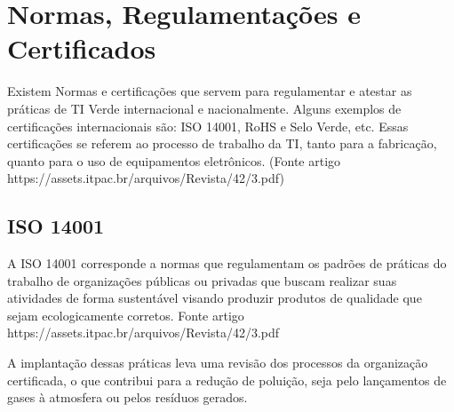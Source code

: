 \section{Normas, Regulamentações e Certificados}
Existem Normas e certificações que servem para regulamentar e atestar as práticas de TI Verde internacional e nacionalmente. Alguns exemplos de certificações internacionais são: ISO 14001, RoHS e Selo Verde, etc. Essas certificações se referem ao processo de trabalho da TI, tanto para a fabricação, quanto para o uso de equipamentos eletrônicos. (Fonte artigo https://assets.itpac.br/arquivos/Revista/42/3.pdf)

\subsection{ISO 14001}
A ISO 14001 corresponde a normas que regulamentam os padrões de práticas do trabalho de organizações públicas ou privadas que buscam realizar suas atividades de forma sustentável visando produzir produtos de qualidade que sejam ecologicamente corretos. Fonte artigo https://assets.itpac.br/arquivos/Revista/42/3.pdf

A implantação dessas práticas leva uma revisão dos processos da organização certificada, o que contribui para a redução de poluição, seja pelo lançamentos de gases à atmosfera ou pelos resíduos gerados. 





